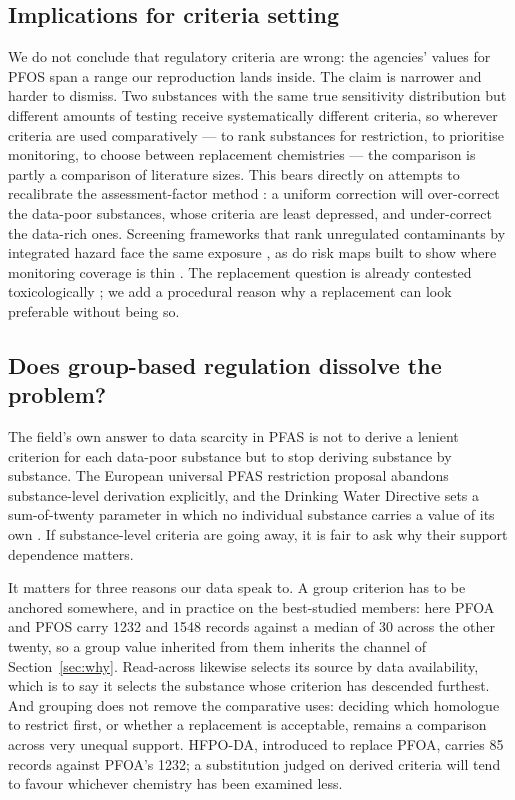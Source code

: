 \documentclass[preprint,12pt]{elsarticle}
\begin{document}
\subsection{Implications for criteria setting}

We do not conclude that regulatory criteria are wrong: the agencies' values for
PFOS span a range our reproduction lands inside. The claim is narrower and
harder to dismiss. Two substances with the same true sensitivity distribution
but different amounts of testing receive systematically different criteria, so
wherever criteria are used comparatively --- to rank substances for
restriction, to prioritise monitoring, to choose between replacement
chemistries --- the comparison is partly a comparison of literature sizes. This
bears directly on attempts to recalibrate the assessment-factor method
\cite{ding2026af}: a uniform correction will over-correct the data-poor
substances, whose criteria are least depressed, and under-correct the
data-rich ones. Screening frameworks that rank unregulated contaminants by
integrated hazard face the same exposure \cite{kim2026dualthreat}, as do
risk maps built to show where monitoring coverage is thin
\cite{kang2026dbpcarto}. The replacement question is already contested
toxicologically \cite{brandsma2022genxsub}; we add a procedural reason why a
replacement can look preferable without being so.

\subsection{Does group-based regulation dissolve the problem?}

The field's own answer to data scarcity in PFAS is not to derive a lenient
criterion for each data-poor substance but to stop deriving substance by
substance. The European universal PFAS restriction proposal abandons
substance-level derivation explicitly, and the Drinking Water Directive sets a
sum-of-twenty parameter in which no individual substance carries a value of its
own \cite{oecd2021pfas, patlewicz2019category}. If substance-level criteria are
going away, it is fair to ask why their support dependence matters.

It matters for three reasons our data speak to. A group criterion has to be
anchored somewhere, and in practice on the best-studied members: here PFOA and
PFOS carry 1232 and 1548 records against a median of 30 across the other
twenty, so a group value inherited from them inherits the channel of
Section~\ref{sec:why}. Read-across likewise selects its source by data
availability, which is to say it selects the substance whose criterion has
descended furthest. And grouping does not remove the comparative uses:
deciding which homologue to restrict first, or whether a replacement is
acceptable, remains a comparison across very unequal support. HFPO-DA,
introduced to replace PFOA, carries 85 records against PFOA's 1232; a
substitution judged on derived criteria will tend to favour whichever
chemistry has been examined less.
\end{document}
